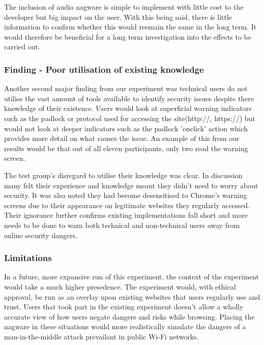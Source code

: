 \documentclass{mpaper}
\begin{document}
The inclusion of audio nagware is simple to implement with little cost to the developer but big impact on the user. With this being said, there is little information to confirm whether this would reemain the same in the long term. It would therefore be beneficial for a long term investigation into the effects to be carried out. 

\subsubsection{Finding - Poor utilisation of existing knowledge}



Another second major finding from our experiment was technical users do not utilise the vast amount of tools available to identify security issues despite there knowledge of their existence. Users would look at superficial warning indicators such as the padlock or protocol used for accessing the site(http://, https://) but would not look at deeper indicators such as the padlock 'onclick' action which provides more detail on what causes the issue. An example of this from our results would be that out of all eleven participants, only two read the warning screen.

The test group's disregard to utilise their knowledge was clear. In discussion many felt their experience and knowledge meant they didn't need to worry about security. It was also noted they had become desensitised to Chrome's warning screens due to their appearance on legitimate websites they regularly accessed. Their ignorance further confirms existing implementations fall short and more needs to be done to warn both technical and non-technical users away from online security dangers.

\subsubsection{Limitations}
In a future, more expansive run of this experiment, the context of the experiment would take a much higher presedence. The experiment would, with ethical approval, be run as an overlay upon existing websites that users regularly use and trust. Users that took part in the existing experiment doesn't allow a wholly accurate view of how users negate dangers and risks while browsing. Placing the nagware in these situations would more realistically simulate the dangers of a man-in-the-middle attack prevailant in public Wi-Fi networks\cite{mitmattacks}.
\end{document}
